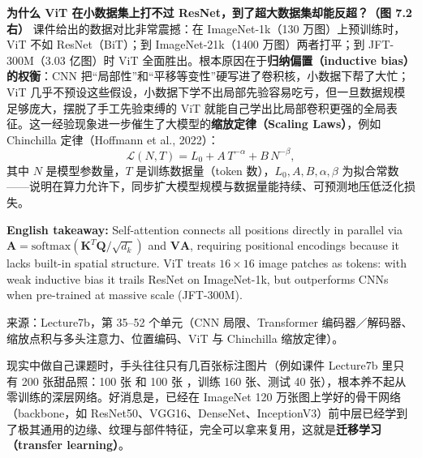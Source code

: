 \textbf{为什么 ViT 在小数据集上打不过 ResNet，到了超大数据集却能反超？（图 7.2 右）} 课件给出的数据对比非常震撼：在 ImageNet-1k（130 万图）上预训练时，ViT 不如 ResNet（BiT）；到 ImageNet-21k（1400 万图）两者打平；到 JFT-300M（3.03 亿图）时 ViT 全面胜出。根本原因在于\textbf{归纳偏置（inductive bias）的权衡}：CNN 把“局部性”和“平移等变性”硬写进了卷积核，小数据下帮了大忙；ViT 几乎不预设这些假设，小数据下学不出局部先验容易吃亏，但一旦数据规模足够庞大，摆脱了手工先验束缚的 ViT 就能自己学出比局部卷积更强的全局表征。这一经验现象进一步催生了大模型的\textbf{缩放定律（Scaling Laws）}，例如 Chinchilla 定律（Hoffmann et al., 2022）：
\[
\mathcal{L}(N, T) = L_0 + A\,T^{-\alpha} + B\,N^{-\beta},
\tag{7.12}
\]
其中 $N$ 是模型参数量，$T$ 是训练数据量（token 数），$L_0, A, B, \alpha, \beta$ 为拟合常数——说明在算力允许下，同步扩大模型规模与数据量能持续、可预测地压低泛化损失。

\textbf{English takeaway:} Self-attention connects all positions directly in parallel via $\mathbf{A}=\mathrm{softmax}(\mathbf{K}^T\mathbf{Q}/\sqrt{d_k})$ and $\mathbf{V}\mathbf{A}$, requiring positional encodings because it lacks built-in spatial structure. ViT treats $16\times 16$ image patches as tokens: with weak inductive bias it trails ResNet on ImageNet-1k, but outperforms CNNs when pre-trained at massive scale (JFT-300M).

来源：Lecture7b，第 35–52 个单元（CNN 局限、Transformer 编码器／解码器、缩放点积与多头注意力、位置编码、ViT 与 Chinchilla 缩放定律）。



现实中做自己课题时，手头往往只有几百张标注图片（例如课件 Lecture7b 里只有 200 张甜品照：100 张  和 100 张 ，训练 160 张、测试 40 张），根本养不起从零训练的深层网络。好消息是，已经在 ImageNet 120 万张图上学好的骨干网络（backbone，如 ResNet50、VGG16、DenseNet、InceptionV3）前中层已经学到了极其通用的边缘、纹理与部件特征，完全可以拿来复用，这就是\textbf{迁移学习（transfer learning）}。


